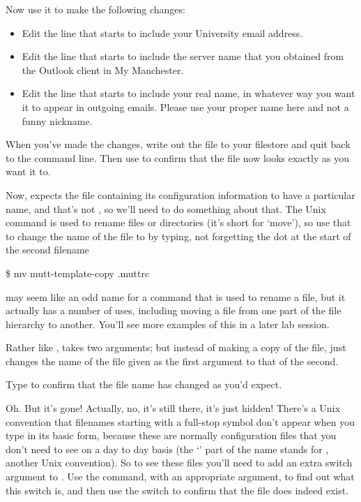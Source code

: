 Now use it to make the following changes:

\begin{itemize}
\item Edit the line that starts  to include your University email address.
\item Edit the line that starts  to include the server name that you obtained from the Outlook client in My Manchester. %
\item Edit the line that starts  to include your real name, in whatever way you want it to appear in outgoing emails. Please use your proper name here and not a funny nickname.
\end{itemize}

When you've made the changes, write out the file to your filestore and quit back to the command line. Then use  to confirm that the file now looks exactly as you want it to.

Now,  expects the file containing its configuration information to have a particular name, and that's not , so we'll need to do something about that. The Unix  command is used to rename files or directories (it's short for `move'), so use that to change the name of the file to  by typing, not forgetting the dot at the start of the second filename


\begin{ttoutenv}
\$ mv mutt-template-copy .muttrc
\end{ttoutenv}


 may seem like an odd name for a command that is used to rename a file, but it actually has a number of uses, including moving a file from one part of the file hierarchy to another. You'll see more examples of this in a later lab session.

Rather like ,  takes two arguments; but instead of making a copy of the file,  just changes the name of the file given as the first argument to that of the second.

Type  to confirm that the file name has changed as you'd expect.

Oh. But it's gone! Actually, no, it's still there, it's just hidden! There's a Unix convention that filenames  starting with a full-stop symbol don't appear when you type  in its basic form, because these are normally configuration files that you don't need to see on a day to day basis (the `' part of the  name stands for , another Unix convention). So to see these files you'll need to add an extra switch argument to . Use the  command, with an appropriate argument, to find out what this switch is, and then use the switch to confirm that the  file does indeed exist.

